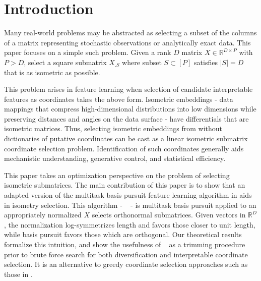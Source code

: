 \section{Introduction}
\label{sec:introduction}

Many real-world problems may be abstracted as selecting a subset of the columns of a matrix representing stochastic observations or analytically exact data.
This paper focuses on a simple such problem.
Given a rank $D$ matrix $ X \in \mathbb R^{D \times P}$ with $P > D$, select a square submatrix $ X_{. S}$ where subset $ S \subset [P]$ satisfies $| S| = D$ that is as isometric as possible.

This problem arises in feature learning when selection of candidate interpretable features as coordinates takes the above form.
Isometric embeddings - data mappings that compress high-dimensional distributions into low dimensions while preserving distances and angles on the data surface - have differentials that are isometric matrices.
Thus, selecting isometric embeddings from without dictionaries of putative coordinates can be cast as a linear isometric submatrix coordinate selection problem.
Identification of such coordinates generally aids mechanistic understanding, generative control, and statistical efficiency.

This paper takes an optimization perspective on the problem of selecting isometric submatrices.
The main contribution of this paper is to show that an adapted version of the multitask basis pursuit feature learning algorithm in \citet{Koelle2024-no} aids in isometry selection.
This algorithm - \isometrypursuit~ - is multitask basis pursuit applied to an appropriately normalized $ X$ selects orthonormal submatrices.
Given vectors in $\mathbb R^D$, the normalization log-symmetrizes length and favors those closer to unit length, while basis pursuit favors those which are orthogonal.
Our theoretical results formalize this intuition, and show the usefulness of \isometrypursuit~ as a trimming procedure prior to brute force search for both diversification and interpretable coordinate selection.
It is an alternative to greedy coordinate selection approaches such as those in \citet{5895106, NEURIPS2019_6a10bbd4, Kohli2021-lr, Jones2007-uc}.

